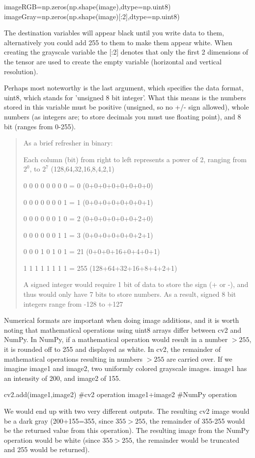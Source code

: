 \documentclass[a4paper,12pt]{article}
\begin{document}
\begin{python}
imageRGB=np.zeros(np.shape(image),dtype=np.uint8)
imageGray=np.zeros(np.shape(image)[:2],dtype=np.uint8)
\end{python}

The destination variables will appear black until you write data to them, alternatively you could add 255 to them to make them appear white. When creating the grayscale variable the [:2] denotes that only the first 2 dimensions of the tensor are used to create the empty variable (horizontal and vertical resolution).

Perhaps most noteworthy is the last argument, which specifies the data format, uint8, which stands for 'unsigned 8 bit integer'. What this means is the numbers stored in this variable must be positive (unsigned, so no +/- sign allowed), whole numbers (as integers are; to store decimals you must use floating point), and 8 bit (ranges from 0-255).


\begin{quote}
	As a brief refresher in binary:

Each column (bit) from right to left represents a power of 2, ranging from $2^0$, to $2^7$ (128,64,32,16,8,4,2,1)

	0 0 0 0 0 0 0 0 = 0   (0+0+0+0+0+0+0+0)
	
	0 0 0 0 0 0 0 1 = 1   (0+0+0+0+0+0+0+1)
	
	0 0 0 0 0 0 1 0 = 2   (0+0+0+0+0+0+2+0)
	
	0 0 0 0 0 0 1 1 = 3   (0+0+0+0+0+0+2+1)
	
	0 0 0 1 0 1 0 1 = 21  (0+0+0+16+0+4+0+1)
	
	1 1 1 1 1 1 1 1 = 255 (128+64+32+16+8+4+2+1)
	
	A signed integer would require 1 bit of data to store the sign (+ or -), and thus would only have 7 bits to store numbers. As a result, signed 8 bit integers range from -128 to +127

\end{quote}
Numerical formats are important when doing image additions, and it is worth noting that mathematical operations using uint8 arrays differ between cv2 and NumPy. In NumPy, if a mathematical operation would result in a number $>255$, it is rounded off to 255 and displayed as white. In cv2, the remainder of mathematical operations resulting in numbers $>255$ are carried over. If we imagine image1 and image2, two uniformly colored grayscale images. image1 has an intensity of 200, and image2 of 155.
\begin{python}
cv2.add(image1,image2) #cv2 operation
image1+image2 #NumPy operation
\end{python}
We would end up with two very different outputs. The resulting cv2 image would be a dark gray (200+155=355, since $355>255$, the remainder of 355-255 would be the returned value from this operation). The resulting image from the NumPy operation would be white (since $355>255$, the remainder would be truncated and 255 would be returned).
\end{document}

